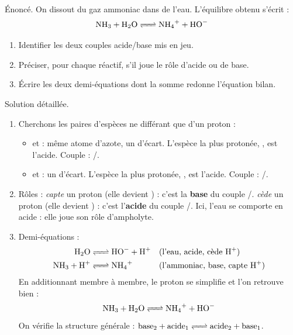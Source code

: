 \documentclass[11pt]{article}
\begin{document}
\begin{exoresolu}
Énoncé. On dissout du gaz ammoniac  dans de l'eau. L'équilibre obtenu s'écrit :
\[ \ce{NH3 + H2O <=> NH4+ + HO-} \]
\begin{enumerate}
\item Identifier les deux couples acide/base mis en jeu.
\item Préciser, pour chaque réactif, s'il joue le rôle d'acide ou de base.
\item Écrire les deux demi-équations dont la somme redonne l'équation bilan.
\end{enumerate}
\tcblower
Solution détaillée.
\begin{enumerate}
\item Cherchons les paires d'espèces ne différant que d'un proton  :
\begin{itemize}
\item {} et  : même atome d'azote, un  d'écart. L'espèce la plus protonée, , est l'acide. Couple : /.
\item {} et  : un  d'écart. L'espèce la plus protonée, , est l'acide. Couple : /.
\end{itemize}
\item Rôles :  \emph{capte} un proton (elle devient ) : c'est la \textbf{base} du couple /.  \emph{cède} un proton (elle devient ) : c'est l'\textbf{acide} du couple /. Ici, l'eau se comporte en acide : elle joue son rôle d'ampholyte.
\item Demi-équations :
\begin{align*}
\ce{H2O &<=> HO- + H+} && \text{(l'eau, acide, cède \ce{H+})}\\
\ce{NH3 + H+ &<=> NH4+} && \text{(l'ammoniac, base, capte \ce{H+})}
\end{align*}
En additionnant membre à membre, le proton  se simplifie et l'on retrouve bien :
\[ \ce{NH3 + H2O <=> NH4+ + HO-} \]
On vérifie la structure générale : $\text{base}_2 + \text{acide}_1 \ce{<=>} \text{acide}_2 + \text{base}_1$.
\end{enumerate}
\end{exoresolu}
\end{document}
